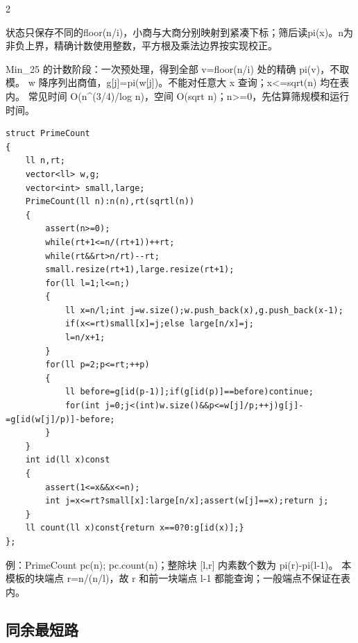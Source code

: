\documentclass[UTF8,fontset=fandol,a4paper,twoside]{ctexart}
\newcommand{\note}[1]{{\fontsize{10}{12}\selectfont #1\par}}
\begin{document}
\begin{multicols}{2}
\note{状态只保存不同的floor(\allowbreak{}n/\allowbreak{}i)\allowbreak{}，小商与大商分别映射到紧凑下标；筛后读pi(\allowbreak{}x)\allowbreak{}。n为非负上界，精确计数使用整数，平方根及乘法边界按实现校正。}
\note{Min\_25 的计数阶段：一次预处理，得到全部 v=\allowbreak{}floor(\allowbreak{}n/\allowbreak{}i)\allowbreak{} 处的精确 pi(\allowbreak{}v)\allowbreak{}，不取模。 w 降序列出商值，g[\allowbreak{}j]\allowbreak{}=\allowbreak{}pi(\allowbreak{}w[\allowbreak{}j]\allowbreak{})\allowbreak{}。不能对任意大 x 查询；x<\allowbreak{}=\allowbreak{}sqrt(\allowbreak{}n)\allowbreak{} 均在表内。 常见时间 O(\allowbreak{}n\textasciicircum{}(\allowbreak{}3/\allowbreak{}4)\allowbreak{}/\allowbreak{}log n)\allowbreak{}，空间 O(\allowbreak{}sqrt n)\allowbreak{}；n>\allowbreak{}=\allowbreak{}0，先估算筛规模和运行时间。}
\begin{lstlisting}
struct PrimeCount
{
    ll n,rt;
    vector<ll> w,g;
    vector<int> small,large;
    PrimeCount(ll n):n(n),rt(sqrtl(n))
    {
        assert(n>=0);
        while(rt+1<=n/(rt+1))++rt;
        while(rt&&rt>n/rt)--rt;
        small.resize(rt+1),large.resize(rt+1);
        for(ll l=1;l<=n;)
        {
            ll x=n/l;int j=w.size();w.push_back(x),g.push_back(x-1);
            if(x<=rt)small[x]=j;else large[n/x]=j;
            l=n/x+1;
        }
        for(ll p=2;p<=rt;++p)
        {
            ll before=g[id(p-1)];if(g[id(p)]==before)continue;
            for(int j=0;j<(int)w.size()&&p<=w[j]/p;++j)g[j]-=g[id(w[j]/p)]-before;
        }
    }
    int id(ll x)const
    {
        assert(1<=x&&x<=n);
        int j=x<=rt?small[x]:large[n/x];assert(w[j]==x);return j;
    }
    ll count(ll x)const{return x==0?0:g[id(x)];}
};
\end{lstlisting}
\note{例：PrimeCount pc(\allowbreak{}n)\allowbreak{}; pc.\allowbreak{}count(\allowbreak{}n)\allowbreak{}；整除块 [\allowbreak{}l,\allowbreak{}r]\allowbreak{} 内素数个数为 pi(\allowbreak{}r)\allowbreak{}-\allowbreak{}pi(\allowbreak{}l-\allowbreak{}1)\allowbreak{}。 本模板的块端点 r=\allowbreak{}n/\allowbreak{}(\allowbreak{}n/\allowbreak{}l)\allowbreak{}，故 r 和前一块端点 l-\allowbreak{}1 都能查询；一般端点不保证在表内。}
\subsection{同余最短路}


\end{multicols}
\end{document}

